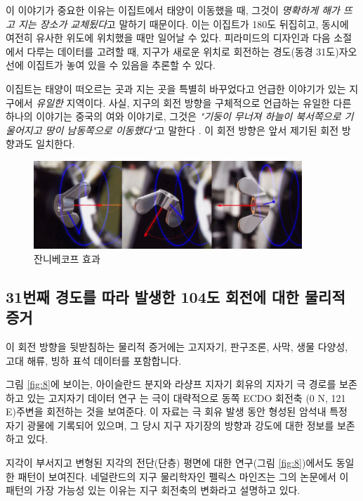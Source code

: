 \documentclass[10pt,twocolumn,letterpaper]{article}
\begin{document}
이 이야기가 중요한 이유는 이집트에서 태양이 이동했을 때, 그것이 \textit{ 명확하게 해가 뜨고 지는 장소가 교체됬다}고 말하기 때문이다. 이는 이집트가 180도 뒤집히고, 동시에 여전히 유사한 위도에 위치했을 때만 일어날 수 있다. 피라미드의 디자인과 다음 소절에서 다루는 데이터를 고려할 때, 지구가 새로운 위치로 회전하는 경도(동경 31도)자오선에 이집트가  놓여 있을 수 있음을 추론할 수 있다.

이집트는 태양이 떠오르는 곳과 지는 곳을 특별히 바꾸었다고 언급한 이야기가 있는 지구에서 \textit{유일한} 지역이다. 사실, 지구의 회전 방향을 구체적으로 언급하는 유일한 다른 하나의 이야기는 중국의 여와 이야기로, 그것은 \textit{"기둥이 무너져 하늘이 북서쪽으로 기울어지고 땅이 남동쪽으로 이동했다"}고 말한다 \cite{8}. 이 회전 방향은 앞서 제기된 회전 방향과도 일치한다.


\begin{figure}[t]
\begin{center}
\includegraphics[width=0.9\textwidth]{dzhani.jpg}
\end{center}
   \caption{잔니베코프 효과  \cite{28}}
\label{fig:10}
\end{figure}

\subsection{31번째 경도를 따라 발생한 104도 회전에 대한 물리적 증거}


이 회전 방향을 뒷받침하는 물리적 증거에는 고지자기, 판구조론, 사막, 생물 다양성, 고대 해류, 빙하 표석 데이터를 포함합니다.

그림 \ref{fig:8}에 보이는, 아이슬란드 분지와 라샹프 지자기 회유의 지자기 극 경로를 보존하고 있는 고지자기 데이터 연구 \cite{35}는 극이 대략적으로 동쪽 ECDO 회전축 (0 N, 121 E)주변을 회전하는 것을 보여준다. 이 자료는 극 회유 발생 동안 형성된 암석내 특정 자기 광물에 기록되어 있으며, 그 당시 지구 자기장의 방향과 강도에 대한 정보를 보존하고 있다.

지각이 부서지고 변형된 지각의 전단(단층) 평면에 대한 연구(그림 \ref{fig:8})에서도  동일한 패턴이 보여진다. 네덜란드의 지구 물리학자인 펠릭스 마인즈는 그의 논문에서 \cite{36} 이 패턴의 가장 가능성 있는 이유는 지구 회전축의 변화라고 설명하고 있다.
\end{document}
